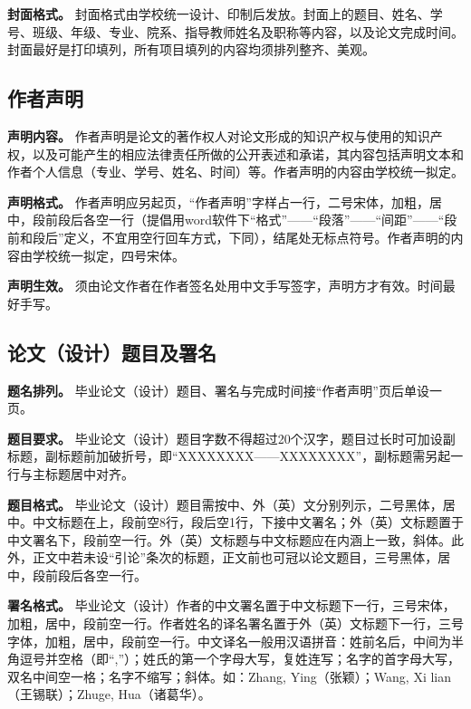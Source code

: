 \documentclass[singlesided]{Style/ucasthesis}%
\begin{document}
\textbf{封面格式。} 封面格式由学校统一设计、印制后发放。封面上的题目、姓名、学号、班级、年级、专业、院系、指导教师姓名及职称等内容，以及论文完成时间。封面最好是打印填列，所有项目填列的内容均须排列整齐、美观。

\hypertarget{section-12}{%
\subsection{作者声明}\label{section-12}}

\textbf{声明内容。} 作者声明是论文的著作权人对论文形成的知识产权与使用的知识产权，以及可能产生的相应法律责任所做的公开表述和承诺，其内容包括声明文本和作者个人信息（专业、学号、姓名、时间）等。作者声明的内容由学校统一拟定。

\textbf{声明格式。} 作者声明应另起页，``作者声明''字样占一行，二号宋体，加粗，居中，段前段后各空一行（提倡用word软件下``格式''------``段落''------``间距''------``段前和段后''定义，不宜用空行回车方式，下同），结尾处无标点符号。作者声明的内容由学校统一拟定，四号宋体。

\textbf{声明生效。} 须由论文作者在作者签名处用中文手写签字，声明方才有效。时间最好手写。

\hypertarget{section-13}{%
\subsection{论文（设计）题目及署名}\label{section-13}}

\textbf{题名排列。} 毕业论文（设计）题目、署名与完成时间接``作者声明''页后单设一页。

\textbf{题目要求。} 毕业论文（设计）题目字数不得超过20个汉字，题目过长时可加设副标题，副标题前加破折号，即``XXXXXXXX------XXXXXXXX''，副标题需另起一行与主标题居中对齐。

\textbf{题目格式。} 毕业论文（设计）题目需按中、外（英）文分别列示，二号黑体，居中。中文标题在上，段前空8行，段后空1行，下接中文署名；外（英）文标题置于中文署名下，段前空一行。外（英）文标题与中文标题应在内涵上一致，斜体。此外，正文中若未设``引论''条次的标题，正文前也可冠以论文题目，三号黑体，居中，段前段后各空一行。

\textbf{署名格式。} 毕业论文（设计）作者的中文署名置于中文标题下一行，三号宋体，加粗，居中，段前空一行。作者姓名的译名署名置于外（英）文标题下一行，三号字体，加粗，居中，段前空一行。中文译名一般用汉语拼音：姓前名后，中间为半角逗号并空格（即``,''）；姓氏的第一个字母大写，复姓连写；名字的首字母大写，双名中间空一格；名字不缩写；斜体。如：Zhang, Ying（张颖）；Wang, Xi lian（王锡联）；Zhuge, Hua（诸葛华）。
\end{document}
